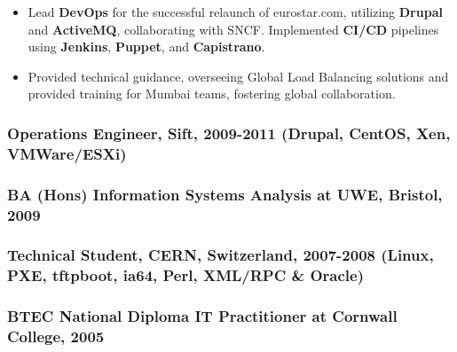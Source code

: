 \documentclass[
]{article}
\begin{document}
\begin{itemize}
\item
  Lead \textbf{DevOps} for the successful relaunch of eurostar.com,
  utilizing \textbf{Drupal} and \textbf{ActiveMQ}, collaborating with
  SNCF. Implemented \textbf{CI/CD} pipelines using \textbf{Jenkins},
  \textbf{Puppet}, and \textbf{Capistrano}.
\item
  Provided technical guidance, overseeing Global Load Balancing
  solutions and provided training for Mumbai teams, fostering global
  collaboration.
\end{itemize}

\hypertarget{material-office-building-operations-engineer-sift-2009-2011-drupal-centos-xen-vmwareesxi}{%
\subsubsection{\texorpdfstring{\faBuilding Operations Engineer, Sift,
2009-2011 {(Drupal, CentOS, Xen,
VMWare/ESXi)}}{ Operations Engineer, Sift, 2009-2011 (Drupal, CentOS, Xen, VMWare/ESXi)}}\label{material-office-building-operations-engineer-sift-2009-2011-drupal-centos-xen-vmwareesxi}}

\hypertarget{material-school-ba-hons-information-systems-analysis-at-uwe-bristol-2009}{%
\subsubsection{\texorpdfstring{\faSchool BA (Hons) Information Systems
Analysis at UWE, Bristol,
2009}{ BA (Hons) Information Systems Analysis at UWE, Bristol, 2009}}\label{material-school-ba-hons-information-systems-analysis-at-uwe-bristol-2009}}

\hypertarget{material-atom-technical-student-cern-switzerland-2007-2008-linux-pxe-tftpboot-ia64-perl-xmlrpc-oracle}{%
\subsubsection{\texorpdfstring{\faAtom Technical Student, CERN,
Switzerland, 2007-2008 (Linux, PXE, tftpboot, ia64, Perl, XML/RPC \&
Oracle)}{ Technical Student, CERN, Switzerland, 2007-2008 (Linux, PXE, tftpboot, ia64, Perl, XML/RPC \& Oracle)}}\label{material-atom-technical-student-cern-switzerland-2007-2008-linux-pxe-tftpboot-ia64-perl-xmlrpc-oracle}}

\hypertarget{material-school-btec-national-diploma-it-practitioner-at-cornwall-college-2005}{%
\subsubsection{\texorpdfstring{\faSchool BTEC National Diploma IT
Practitioner at Cornwall College,
2005}{ BTEC National Diploma IT Practitioner at Cornwall College, 2005}}\label{material-school-btec-national-diploma-it-practitioner-at-cornwall-college-2005}}
\end{document}
